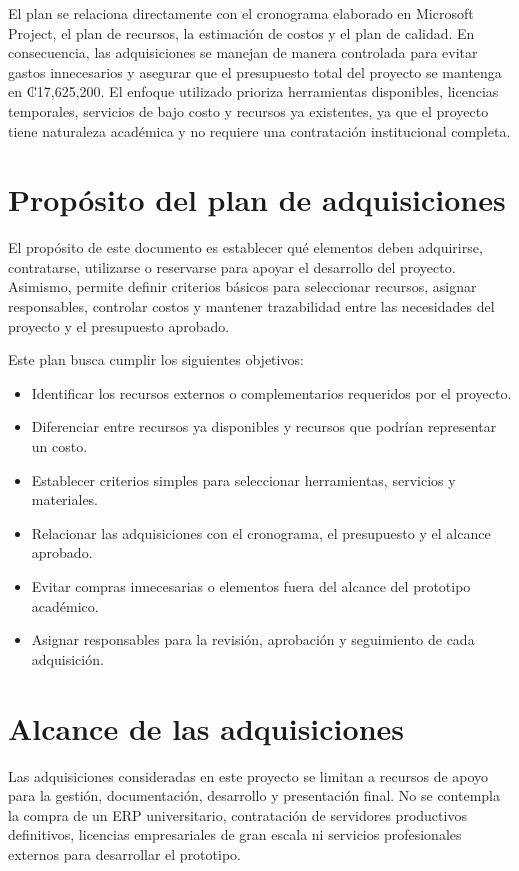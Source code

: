 \documentclass[11pt,spanish]{article}
\begin{document}
El plan se relaciona directamente con el cronograma elaborado en Microsoft Project, el plan de recursos, la estimación de costos y el plan de calidad. En consecuencia, las adquisiciones se manejan de manera controlada para evitar gastos innecesarios y asegurar que el presupuesto total del proyecto se mantenga en ₡17,625,200. El enfoque utilizado prioriza herramientas disponibles, licencias temporales, servicios de bajo costo y recursos ya existentes, ya que el proyecto tiene naturaleza académica y no requiere una contratación institucional completa.

\section{Propósito del plan de adquisiciones}

El propósito de este documento es establecer qué elementos deben adquirirse, contratarse, utilizarse o reservarse para apoyar el desarrollo del proyecto. Asimismo, permite definir criterios básicos para seleccionar recursos, asignar responsables, controlar costos y mantener trazabilidad entre las necesidades del proyecto y el presupuesto aprobado.

Este plan busca cumplir los siguientes objetivos:

\begin{itemize}[leftmargin=*, label={\textbullet}]
    \item Identificar los recursos externos o complementarios requeridos por el proyecto.
    \item Diferenciar entre recursos ya disponibles y recursos que podrían representar un costo.
    \item Establecer criterios simples para seleccionar herramientas, servicios y materiales.
    \item Relacionar las adquisiciones con el cronograma, el presupuesto y el alcance aprobado.
    \item Evitar compras innecesarias o elementos fuera del alcance del prototipo académico.
    \item Asignar responsables para la revisión, aprobación y seguimiento de cada adquisición.
\end{itemize}

\section{Alcance de las adquisiciones}

Las adquisiciones consideradas en este proyecto se limitan a recursos de apoyo para la gestión, documentación, desarrollo y presentación final. No se contempla la compra de un ERP universitario, contratación de servidores productivos definitivos, licencias empresariales de gran escala ni servicios profesionales externos para desarrollar el prototipo.
\end{document}
